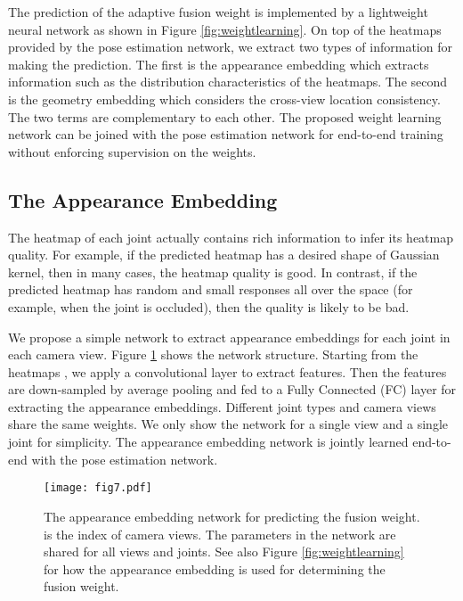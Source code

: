 The prediction of the adaptive fusion weight  is implemented by a lightweight neural network as shown in Figure \ref{fig:weightlearning}. On top of the heatmaps  provided by the pose estimation network, we extract two types of information for making the prediction. The first is the appearance embedding which extracts information such as the distribution characteristics of the heatmaps. The second is the geometry embedding which considers the cross-view location consistency. The two terms are complementary to each other. The proposed weight learning network can be joined with the pose estimation network for end-to-end training without enforcing supervision on the weights. 









\subsection{The Appearance Embedding}
The heatmap of each joint actually contains rich information to infer its heatmap quality. For example, if the predicted heatmap has a desired shape of Gaussian kernel, then in many cases, the heatmap quality is good. In contrast, if the predicted heatmap has random and small responses all over the space (for example, when the joint is occluded), then the quality is likely to be bad.


We propose a simple network to extract appearance embeddings for each joint in each camera view. Figure \ref{fig:appearance} shows the network structure. Starting from the heatmaps , we apply a convolutional layer to extract features. Then the features are down-sampled by average pooling and fed to a Fully Connected (FC) layer for extracting the appearance embeddings. Different joint types and camera views share the same weights. We only show the network for a single view and a single joint for simplicity. The appearance embedding network is jointly learned end-to-end with the pose estimation network.





\begin{figure}
    \centering
    \texttt{[image: fig7.pdf]}
    \caption{The appearance embedding network for predicting the fusion weight. 
     is the index of camera views. The parameters in the network are shared for all views and joints. See also Figure \ref{fig:weightlearning} for how the appearance embedding  is used for determining the fusion weight. }
    \label{fig:appearance}
\end{figure}

